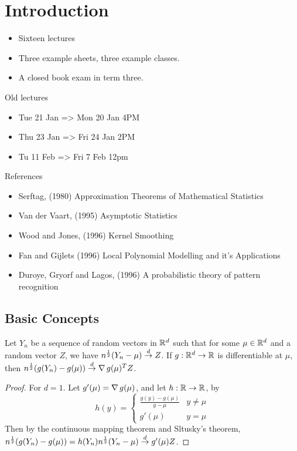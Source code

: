 
\chapter{Introduction}
\label{cha:introduction}

\begin{itemize}
\item Sixteen lectures
\item Three example sheets, three example classes.
\item A closed book exam in term three.
\end{itemize}

Old lectures
\begin{itemize}
\item Tue 21 Jan => Mon 20 Jan 4PM
\item Thu 23 Jan => Fri 24 Jan 2PM
\item  Tu 11 Feb => Fri 7 Feb 12pm
\end{itemize}

References

\begin{itemize}
\item Serftag, (1980) Approximation Theorems of Mathematical Statistics
\item Van der Vaart, (1995) Asymptotic Statistics
\item Wood and Jones, (1996) Kernel Smoothing
\item Fan and Gijlets (1996) Local Polynomial Modelling and it's Applications
\item Duroye, Gryorf and Lagos, (1996) A probabilistic theory of pattern recognition

\end{itemize}

\section{Basic Concepts}
\label{sec:basic-concepts}

\begin{thm}
  Let $Y_{n}$ be a sequence of random vectors in $\mathbb{R}^{d}$ such that
  for some $\mu \in \mathbb{R}^{d}$ and a random vector $Z$, we have
  $n^{\frac{1}{2}}(Y_{n} - \mu) \overset{d}{\rightarrow} Z$.  If $g: \mathbb{R}^{d} \rightarrow \mathbb{R}$
  is differentiable at $\mu$, then $n^{\frac{1}{2}}(g(Y_{n}) - g(\mu))
  \overset{d}{\rightarrow} \operatorname*{\nabla} g(\mu)^{T} Z$.
\end{thm}
\begin{proof}
  For $d = 1$.  Let $g'(\mu) = \operatorname*{\nabla} g(\mu)$, and let $h: \mathbb{R}
  \rightarrow \mathbb{R}$, by
  \begin{equation}
    \label{eq:134}
    h(y) =
    \begin{cases}
      \frac{g(y) - g(\mu)}{y - \mu}  & y \neq \mu \\
      g'(\mu) & y = \mu
    \end{cases}
  \end{equation}  Then by the continuous mapping theorem and Sltusky's
  theorem, $n^{\frac{1}{2}}(g(Y_{n}) - g(\mu)) = h(Y_{n})
  n^{\frac{1}{2}}(Y_{n} - \mu) \overset{d}{\rightarrow} g'(\mu) Z$.
\end{proof}


